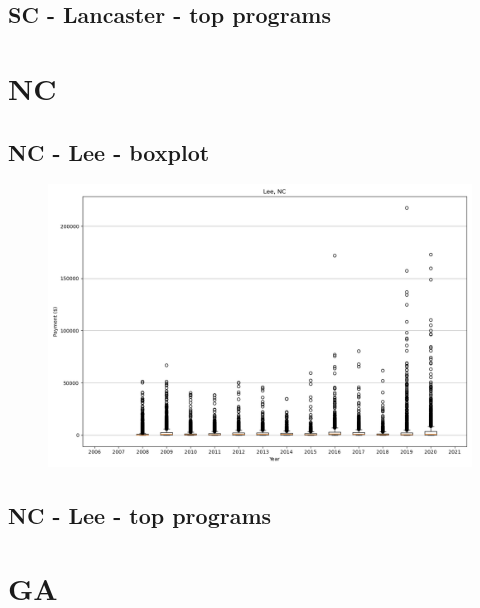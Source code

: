 \subsection*{SC - Lancaster - top programs}

\newpage
\section*{NC}
\subsection*{NC - Lee - boxplot}
\begin{figure}[h]
\centering
\includegraphics[width=7in]{../output/boxplots/counties/Lee-NC_boxplot.png}
\end{figure}


\subsection*{NC - Lee - top programs}

\newpage
\section*{GA}
